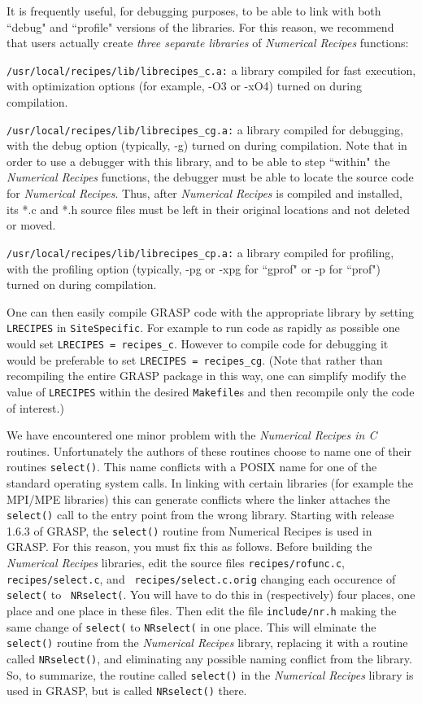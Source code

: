 It is frequently useful, for debugging purposes, to be able to link
with both ``debug" and ``profile" versions of the libraries.  For this
reason, we recommend that users actually create {\it three separate
libraries} of {\it Numerical Recipes} functions:
\begin{description}
\item{\tt /usr/local/recipes/lib/librecipes\_c.a:}
a library compiled for fast execution, with optimization options (for
example, -O3 or -xO4) turned on during compilation.
\item{\tt /usr/local/recipes/lib/librecipes\_cg.a:}
a library compiled for debugging, with the debug option (typically, -g)
turned on during compilation.  Note that in order to use a debugger
with this library, and to be able to step ``within" the {\it Numerical
Recipes} functions, the debugger must be able to locate the source code
for {\it Numerical Recipes}.  Thus, after {\it Numerical Recipes} is
compiled and installed, its *.c and *.h source files must be left in
their original locations and not deleted or moved.
\item{\tt /usr/local/recipes/lib/librecipes\_cp.a:}
a library compiled for profiling, with the profiling option (typically,
-pg or -xpg for ``gprof" or -p for ``prof") turned on during compilation.
\end{description}
One can then easily compile GRASP code with the appropriate library by
setting {\tt LRECIPES} in {\tt SiteSpecific}.  For example to run code
as rapidly as possible one would set \mbox{\tt LRECIPES = recipes\_c}.
However to compile code for debugging it would be preferable to set
\mbox{\tt LRECIPES = recipes\_cg}.  (Note that rather than recompiling the
entire GRASP package in this way, one can simplify modify the value of
{\tt LRECIPES} within the desired {\tt Makefile}s and then recompile
only the code of interest.)

We have encountered one minor problem with the {\it Numerical Recipes
in C} routines.  Unfortunately the authors of these routines choose to
name one of their routines {\tt select()}.  This name conflicts with a
POSIX name for one of the standard operating system calls.  In linking
with certain libraries (for example the MPI/MPE libraries) this can
generate conflicts where the linker attaches the {\tt select()} call to
the entry point from the wrong library.  
Starting with release 1.6.3 of GRASP, the {\tt select()} routine from
Numerical Recipes is used in GRASP.  For this reason, you must
fix this
as follows.  Before building the {\it Numerical Recipes} libraries, edit
the source files {\tt recipes/rofunc.c}, {\tt recipes/select.c}, and {\tt
recipes/select.c.orig} changing each occurence of {\tt select(} to {\tt
NRselect(}.  You will have to do this in (respectively) four places, one
place and one place in these files.  Then edit the file {\tt include/nr.h}
making the same change of {\tt select(} to {\tt NRselect(} in one place.
This will elminate the {\tt select()} routine from the {\it Numerical
Recipes} library, replacing it with a routine called {\tt NRselect()},
and eliminating any possible naming conflict from the library.
So, to summarize, the routine called {\tt select()} in the {\it Numerical
Recipes} library is used in GRASP, but is called {\tt NRselect()} there.

